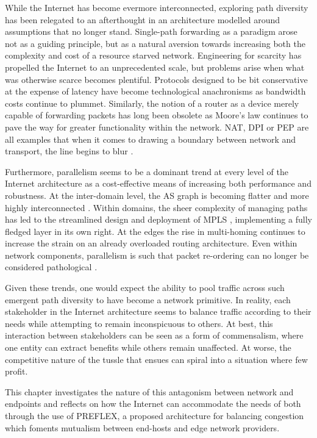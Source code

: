 While the Internet has become evermore interconnected, exploring path diversity has been relegated to an afterthought in an architecture modelled around assumptions that no longer stand. 
Single-path forwarding as a paradigm arose not as a guiding principle, but as a natural aversion towards increasing both the complexity and cost of a resource starved network.
Engineering for scarcity has propelled the Internet to an unprecedented scale, but problems arise when what was otherwise scarce becomes plentiful. 
Protocols designed to be bit conservative at the expense of latency have become technological anachronisms as bandwidth costs continue to plummet. 
Similarly, the notion of a router as a device merely capable of forwarding packets has long been obsolete as Moore's law continues to pave the way for greater functionality within the network. 
\ac{NAT}, \ac{DPI} or \ac{PEP} are all examples that when it comes to drawing a boundary between network and transport, the line begins to blur \cite{Ford:2008p34}.

Furthermore, parallelism seems to be a dominant trend at every level of the Internet architecture as a cost-effective means of increasing both performance and robustness. 
At the inter-domain level, the \ac{AS} graph is becoming flatter and more highly interconnected \cite{Haddadi:2010p129}. 
Within domains, the sheer complexity of managing paths has led to the streamlined design and deployment of \ac{MPLS} \cite{Rosen:2001p147}, implementing a fully fledged layer in its own right. 
At the edges the rise in multi-homing continues to increase the strain on an already overloaded routing architecture. 
Even within network components, parallelism is such that packet re-ordering can no longer be considered pathological \cite{Bennett:1999p120}.

Given these trends, one would expect the ability to pool traffic across such emergent path diversity to have become a network primitive. 
In reality, each stakeholder in the Internet architecture seems to balance traffic according to their needs while attempting to remain inconspicuous to others. 
At best, this interaction between stakeholders can be seen as a form of commensalism, where one entity can extract benefits while others remain unaffected. 
At worse, the competitive nature of the tussle \cite{Clark:2005p67} that ensues can spiral into a situation where few profit.

This chapter investigates the nature of this antagonism between network and endpoints and reflects on how the Internet can accommodate the needs of both through the use of \ac{PREFLEX}, a proposed architecture for balancing congestion which foments mutualism between end-hosts and edge network providers.
